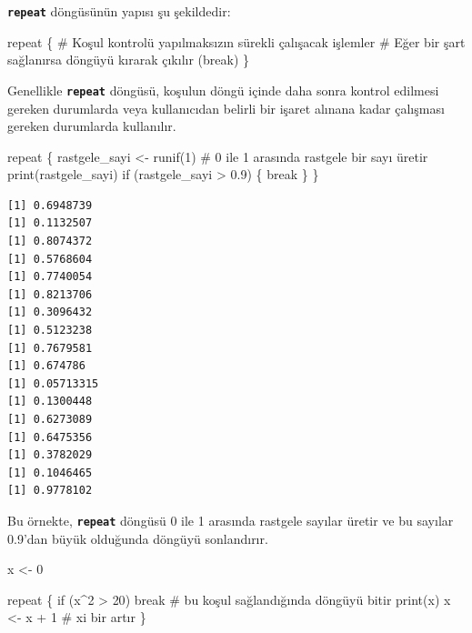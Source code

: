\documentclass[
  letterpaper,
  DIV=11,
  numbers=noendperiod]{scrreprt}
\newenvironment{Shaded}{\begin{snugshade}}{\end{snugshade}}
\newcommand{\CommentTok}[1]{\textcolor[rgb]{0.37,0.37,0.37}{#1}}
\newcommand{\ControlFlowTok}[1]{\textcolor[rgb]{0.00,0.23,0.31}{#1}}
\newcommand{\DecValTok}[1]{\textcolor[rgb]{0.68,0.00,0.00}{#1}}
\newcommand{\FloatTok}[1]{\textcolor[rgb]{0.68,0.00,0.00}{#1}}
\newcommand{\FunctionTok}[1]{\textcolor[rgb]{0.28,0.35,0.67}{#1}}
\newcommand{\NormalTok}[1]{\textcolor[rgb]{0.00,0.23,0.31}{#1}}
\newcommand{\OtherTok}[1]{\textcolor[rgb]{0.00,0.23,0.31}{#1}}
\newcommand{\SpecialCharTok}[1]{\textcolor[rgb]{0.37,0.37,0.37}{#1}}
\begin{document}
\textbf{\texttt{repeat}} döngüsünün yapısı şu şekildedir:

\begin{Shaded}
\begin{Highlighting}[]
\ControlFlowTok{repeat}\NormalTok{ \{}
  \CommentTok{\# Koşul kontrolü yapılmaksızın sürekli çalışacak işlemler}
  \CommentTok{\# Eğer bir şart sağlanırsa döngüyü kırarak çıkılır (break)}
\NormalTok{\}}
\end{Highlighting}
\end{Shaded}

Genellikle \textbf{\texttt{repeat}} döngüsü, koşulun döngü içinde daha
sonra kontrol edilmesi gereken durumlarda veya kullanıcıdan belirli bir
işaret alınana kadar çalışması gereken durumlarda kullanılır.

\begin{Shaded}
\begin{Highlighting}[]
\ControlFlowTok{repeat}\NormalTok{ \{}
\NormalTok{  rastgele\_sayi }\OtherTok{\textless{}{-}} \FunctionTok{runif}\NormalTok{(}\DecValTok{1}\NormalTok{)  }\CommentTok{\# 0 ile 1 arasında rastgele bir sayı üretir}
  \FunctionTok{print}\NormalTok{(rastgele\_sayi)}
  \ControlFlowTok{if}\NormalTok{ (rastgele\_sayi }\SpecialCharTok{\textgreater{}} \FloatTok{0.9}\NormalTok{) \{}
    \ControlFlowTok{break}
\NormalTok{  \}}
\NormalTok{\}}
\end{Highlighting}
\end{Shaded}

\begin{verbatim}
[1] 0.6948739
[1] 0.1132507
[1] 0.8074372
[1] 0.5768604
[1] 0.7740054
[1] 0.8213706
[1] 0.3096432
[1] 0.5123238
[1] 0.7679581
[1] 0.674786
[1] 0.05713315
[1] 0.1300448
[1] 0.6273089
[1] 0.6475356
[1] 0.3782029
[1] 0.1046465
[1] 0.9778102
\end{verbatim}

Bu örnekte, \textbf{\texttt{repeat}} döngüsü 0 ile 1 arasında rastgele
sayılar üretir ve bu sayılar 0.9'dan büyük olduğunda döngüyü
sonlandırır.

\begin{Shaded}
\begin{Highlighting}[]
\NormalTok{x }\OtherTok{\textless{}{-}} \DecValTok{0}

\ControlFlowTok{repeat}\NormalTok{ \{}
    \ControlFlowTok{if}\NormalTok{ (x}\SpecialCharTok{\^{}}\DecValTok{2} \SpecialCharTok{\textgreater{}} \DecValTok{20}\NormalTok{) }\ControlFlowTok{break}     \CommentTok{\# bu koşul sağlandığında döngüyü bitir}
    \FunctionTok{print}\NormalTok{(x)               }
\NormalTok{    x }\OtherTok{\textless{}{-}}\NormalTok{ x }\SpecialCharTok{+} \DecValTok{1}              \CommentTok{\# x\textquotesingle{}i bir artır}
\NormalTok{\}}
\end{Highlighting}
\end{Shaded}
\end{document}
